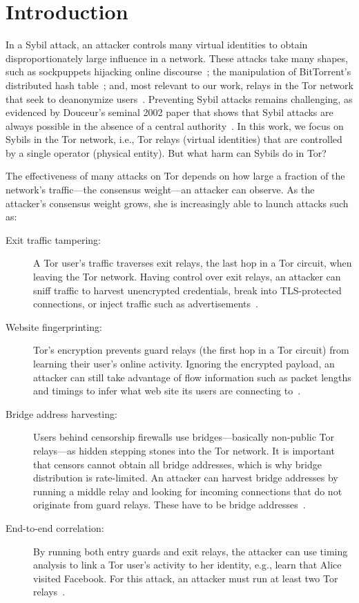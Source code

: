 \section{Introduction}
\label{sec:introduction}

In a Sybil attack, an attacker controls many virtual identities to
obtain disproportionately large influence in a network.  These attacks take many
shapes, such as sockpuppets hijacking online discourse~\cite{Thomas2012a}; the
manipulation of BitTorrent's distributed hash table~\cite{Wang2012a}; and, most
relevant to our work, relays in the Tor network that seek to deanonymize
users~\cite{cmucert}.  Preventing Sybil attacks remains challenging, as
evidenced by Douceur's seminal 2002 paper that shows that Sybil attacks are
always possible in the absence of a central authority~\cite{Douceur2002a}.  In
this work, we focus on Sybils in the Tor network, i.e., Tor relays (virtual
identities) that are controlled by a single operator (physical entity).  But
what harm can Sybils do in Tor?

The effectiveness of many attacks on Tor depends on how large a fraction of the
network's traffic---the consensus weight---an attacker can observe.  As the
attacker's consensus weight grows, she is increasingly able to launch attacks
such as:
\begin{description}
	\item[Exit traffic tampering:] A Tor user's traffic traverses exit relays, the
		last hop in a Tor circuit, when leaving the Tor network.  Having control
		over exit relays, an attacker can sniff traffic to harvest unencrypted
		credentials, break into TLS-protected connections, or inject traffic
		such as advertisements~\cite{Winter2014a}.
	\item[Website fingerprinting:] Tor's encryption prevents guard relays (the
		first hop in a Tor circuit) from learning their user's online activity.
		Ignoring the encrypted payload, an attacker can still take advantage of
		flow information such as packet lengths and timings to infer what web
		site its users are connecting to~\cite{Juarez2014a}.
	\item[Bridge address harvesting:] Users behind censorship firewalls use
		bridges---basically non-public Tor relays---as hidden stepping stones
		into the Tor network.  It is important that censors cannot obtain all bridge
		addresses, which is why bridge distribution is rate-limited.  An
		attacker can harvest bridge addresses by running a middle relay and
		looking for incoming connections that do not originate from guard
		relays.  These have to be bridge addresses~\cite{Ling2012a}.
	\item[End-to-end correlation:] By running both entry guards and exit relays,
		the attacker can use timing analysis to link a Tor user's activity to
		her identity, e.g., learn that Alice visited Facebook.  For this attack,
		an attacker must run at least two Tor relays~\cite{Johnson2013a}.
\end{description}

